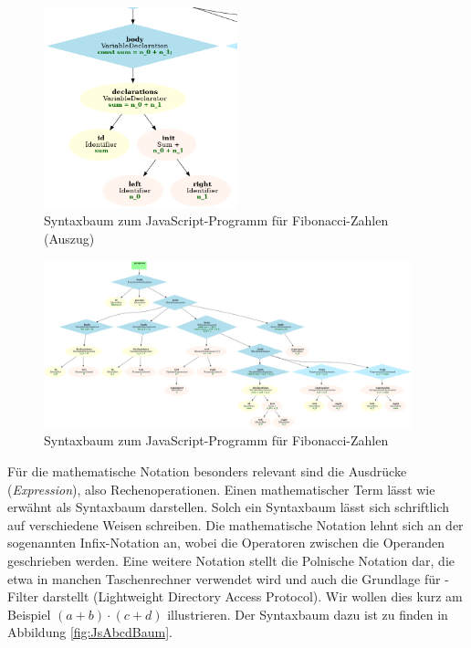 \begin{figure}[h]
	\caption{Syntaxbaum zum JavaScript-Programm für Fibonacci-Zahlen (Auszug)}
	\label{fig:JsFibinacciBaumPart}
	\centering
	\includegraphics[width=0.5\textwidth]{./img/js-tree-fibonacci-part.png}
\end{figure}


\begin{figure}[p]
	\caption{Syntaxbaum zum JavaScript-Programm für Fibonacci-Zahlen}
	\label{fig:JsFibinacciBaum}
	\centering
	\includegraphics[width=0.95\textwidth]{./img/js-tree-fibonacci.png}
\end{figure}

Für die mathematische Notation besonders relevant sind die Ausdrücke (\emph{Expression}), also Rechenoperationen. Einen mathematischer Term lässt wie erwähnt als Syntaxbaum darstellen. Solch ein Syntaxbaum lässt sich schriftlich auf verschiedene Weisen schreiben. Die mathematische Notation lehnt sich an der sogenannten Infix-Notation an, wobei die Operatoren zwischen die Operanden geschrieben werden. Eine weitere Notation stellt die Polnische Notation dar, die etwa in manchen Taschenrechner verwendet wird und auch die Grundlage für -Filter darstellt (Lightweight Directory Access Protocol). Wir wollen dies kurz am Beispiel $(a+b)\cdot(c+d)$ illustrieren. Der Syntaxbaum dazu ist zu finden in Abbildung \ref{fig:JsAbcdBaum}.


